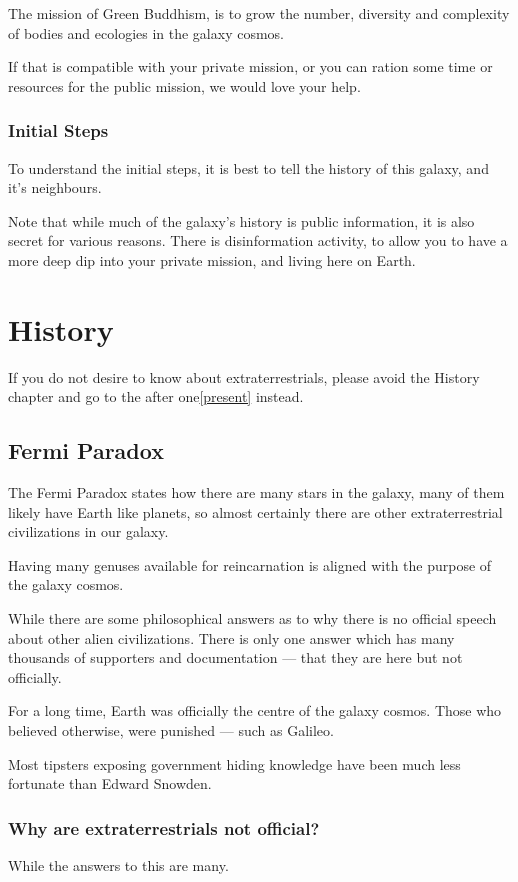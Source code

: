 \documentclass{report}
\begin{document}
The mission of Green Buddhism, is to grow the number, diversity and complexity of bodies and
ecologies in the galaxy cosmos. 

If that is compatible with your private mission, or you can ration some time or
resources for
the public mission, we would love your help.

\subsection{Initial Steps}

To understand the initial steps, it is best to tell the history of this galaxy,
and it's neighbours.

Note that while much of the galaxy's history is public information, it is also
secret for various reasons. There is disinformation activity, to allow you to
have a more deep dip into your private mission, and living here on Earth.


\chapter{History}

If you do not desire to know about extraterrestrials, please avoid the History
chapter and go to the after one\ref{present} instead.

\section{Fermi Paradox}
The Fermi Paradox states how there are many stars in the galaxy, many of them
likely have Earth like planets, so almost certainly there are other
extraterrestrial civilizations in our galaxy. 

Having many genuses available for reincarnation is aligned with the purpose of
the galaxy cosmos.

While there are some philosophical answers as to why there is no official speech 
about other alien civilizations. There is only one answer which has many
thousands of supporters and documentation --- that they are here but not officially. 

For a long time, Earth was officially the centre of the galaxy cosmos. Those who
believed otherwise, were punished --- such as Galileo.

Most tipsters exposing government hiding knowledge have been much less fortunate
 than Edward Snowden.

\subsection{Why are extraterrestrials not official?}
While the answers to this are many. 
\end{document}
